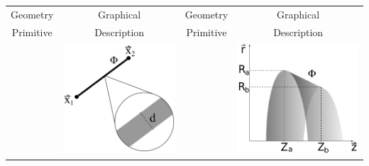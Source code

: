 \documentclass[11pt,a4paper,oneside]{article}
\begin{document}
\begin{table}
\centering
\begin{tabular}{|c|c||c|c|}
\hline
Geometry & Graphical & Geometry & Graphical\\
Primitive & Description & Primitive & Description\\
\hline
& \multirow{3}{*}{\includegraphics[scale=.18]{wire.ps}} & &
\multirow{3}{*}{\includegraphics[scale=.18]{conicSect.ps}} \\

\end{tabular}
\end{table}
\end{document}
